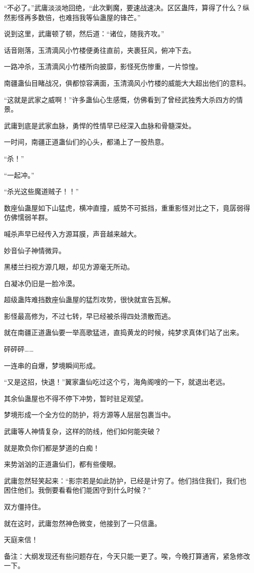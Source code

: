 \begin{this_body}
“不必了。”武庸淡淡地回绝，“此次剿魔，要速战速决。区区蛊阵，算得了什么？纵然影怪再多数倍，也难挡我等仙蛊屋的锋芒。”

说到这里，武庸顿了顿，然后道：“诸位，随我齐攻。”

话音刚落，玉清滴风小竹楼便勇往直前，夹裹狂风，俯冲下去。

一路冲杀，玉清滴风小竹楼所向披靡，影怪死伤惨重，一片惊惶。

南疆蛊仙目睹战况，俱都惊容满面，玉清滴风小竹楼的威能大大超出他们的意料。

“这就是武家之威啊！”许多蛊仙心生感慨，仿佛看到了曾经武独秀大杀四方的情景。

武庸到底是武家血脉，勇悍的性情早已经深入血脉和骨髓深处。

一时间，南疆正道蛊仙们的心头，都涌上了一股热意。

“杀！”

“一起冲。”

“杀光这些魔道贼子！！”

数座仙蛊屋如下山猛虎，横冲直撞，威势不可抵挡，重重影怪对比之下，竟孱弱得仿佛懦弱羊群。

喊杀声早已经传入方源耳膜，声音越来越大。

妙音仙子神情微异。

黑楼兰扫视方源几眼，却见方源毫无所动。

白凝冰仍旧是一脸冷漠。

超级蛊阵难挡数座仙蛊屋的猛烈攻势，很快就宣告瓦解。

影怪最高修为，不过七转，早已经被杀得四处溃散而逃。

就在南疆正道蛊仙要一举高歌猛进，直捣黄龙的时候，纯梦求真体们站了出来。

砰砰砰……

一连串的自爆，梦境瞬间形成。

“又是这招，快退！”翼家蛊仙吃过这个亏，海角阁嗖的一下，就退出老远。

其余仙蛊屋也不得不停下冲势，暂时驻足观望。

梦境形成一个全方位的防护，将方源等人层层包裹当中。

武庸等人神情复杂，这样的防线，他们如何能突破？

就是欺负你们都是梦道的白痴！

来势汹汹的正道蛊仙们，都有些傻眼。

武庸忽然轻笑起来：“影宗若是如此防护，已经是计穷了。他们挡住我们，我们也困住他们。我倒要看看他们能困守到什么时候？”

双方僵持住。

就在这时，武庸忽然神色微变，他接到了一只信蛊。

天庭来信！

备注：大纲发现还有些问题存在，今天只能一更了。唉，今晚打算通宵，紧急修改一下。

\end{this_body}

